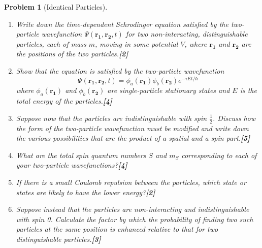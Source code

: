 \documentclass[a4paper]{article}
\theoremstyle{new}
\newtheorem{qns}{Problem}[subsection]
\begin{document}
\newpage
\begin{qns}[Identical Particles]\leavevmode
\begin{enumerate}[label=(\roman*)]
\item Write down the time-dependent Schrodinger equation satisfied by the two-particle wavefunction $\Psi(\mathbf{r_1},\mathbf{r_2},t)$ for two non-interacting, distinguishable particles, each of mass $m$, moving in some potential $V$, where $\mathbf{r_1}$ and $\mathbf{r_2}$ are the positions of the two particles.\hfill\textbf{[2]}
\item Show that the equation is satisfied by the two-particle wavefunction
$$\Psi(\mathbf{r_1},\mathbf{r_2},t)=\phi_a(\mathbf{r_1})\phi_b(\mathbf{r_2})e^{-iEt/\hbar}$$
where $\phi_a(\mathbf{r_1})$ and $\phi_b(\mathbf{r_2})$ are single-particle stationary states and $E$ is the total energy of the particles.\hfill\textbf{[4]}
\item Suppose now that the particles are indistinguishable with spin $\frac{1}{2}$. Discuss how the form of the two-particle wavefunction must be modified and write down the various possibilities that are the product of a spatial and a spin part.\hfill\textbf{[5]}
\item What are the total spin quantum numbers $S$ and $m_S$ corresponding to each of your two-particle wavefunctions?\hfill\textbf{[4]}
\item If there is a small Coulomb repulsion between the particles, which state or states are likely to have the lower energy?\hfill\textbf{[2]}
\item Suppose instead that the particles are non-interacting and indistinguishable with spin 0. Calculate the factor by which the probability of finding two such particles at the same position is enhanced relative to that for two distinguishable particles.\hfill\textbf{[3]}
\end{enumerate}
\end{qns}
\end{document}
